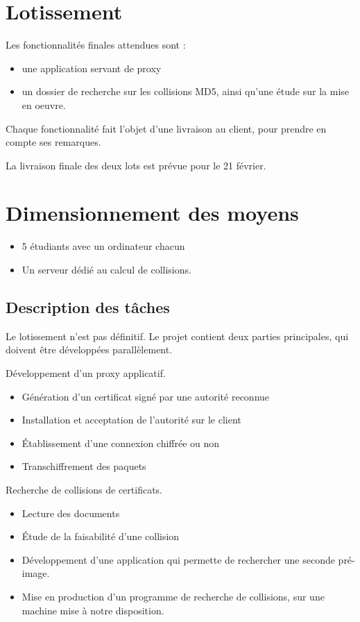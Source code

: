 \documentclass[a4paper,11pt,french]{article}
\begin{document}
\newpage
\section{Lotissement}

Les fonctionnalités finales attendues sont :
\begin{itemize}
\item une application servant de proxy  
\item un dossier de recherche sur les collisions MD5, ainsi qu'une étude sur la mise en oeuvre.
\end{itemize}

Chaque fonctionnalité fait l'objet d'une livraison au client, pour prendre en compte ses remarques.

La livraison finale des deux lots est prévue pour le 21 février.

\newpage
\section{Dimensionnement des moyens}

\begin{itemize}
\item 5 étudiants avec un ordinateur chacun
\item Un serveur dédié au calcul de collisions.
\end{itemize}

\subsection{Description des tâches}

Le lotissement n'est pas définitif. Le projet contient deux parties principales, qui doivent être développées parallèlement.

Développement d'un proxy applicatif.
\begin{itemize}
\item Génération d'un certificat signé par une autorité reconnue
\item Installation et acceptation de l'autorité sur le client
\item Établissement d'une connexion chiffrée ou non
\item Transchiffrement des paquets
\end{itemize}
Recherche de collisions de certificats.
\begin{itemize}
\item Lecture des documents
\item Étude de la faisabilité d'une collision
\item Développement d'une application qui permette de rechercher une seconde pré-image.
\item Mise en production d'un programme de recherche de collisions, sur une machine mise à notre disposition.
\end{itemize}
\end{document}
